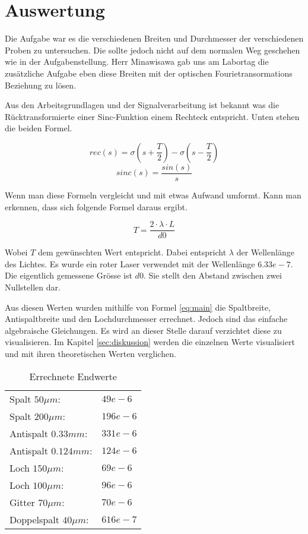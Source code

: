 \section{Auswertung}
Die Aufgabe war es die verschiedenen Breiten und Durchmesser der verschiedenen Proben zu untersuchen. Die sollte jedoch nicht auf dem normalen Weg geschehen wie in der Aufgabenstellung. Herr Minawisawa gab uns am Labortag die zusätzliche Aufgabe eben diese Breiten mit der optischen Fourietransormations Beziehung zu lösen.

Aus den Arbeitsgrundlagen und der Signalverarbeitung ist bekannt was die Rücktransformierte einer Sinc-Funktion einem Rechteck entspricht. Unten stehen die beiden Formel.

\begin{equation}
		rec(s)=\sigma(s+\frac{T}{2}) -\sigma(s-\frac{T}{2})
\end{equation}
\begin{equation}
		sinc(s)=\frac{sin(s)}{s}
\end{equation}

Wenn man diese Formeln vergleicht und mit etwas Aufwand umformt. Kann man erkennen, dass sich folgende Formel daraus ergibt.

\begin{equation}
T = \frac{2\cdot \lambda \cdot L}{d0}
\label{eq:main}
\end{equation}

Wobei $T$ dem gewünschten Wert entspricht. Dabei entspricht $\lambda$ der Wellenlänge des Lichtes. Es wurde ein roter Laser verwendet mit der Wellenlänge $6.33e-7$. Die eigentlich gemessene Grösse ist $d0$. Sie stellt den Abstand zwischen zwei Nullstellen dar.

Aus diesen Werten wurden mithilfe von Formel \ref{eq:main} die Spaltbreite, Antispaltbreite und den Lochdurchmesser errechnet. Jedoch sind das einfache algebraische Gleichungen. Es wird an dieser Stelle darauf verzichtet diese zu visualisieren. Im Kapitel \ref{sec:diskussion} werden die einzelnen Werte visualisiert und mit ihren theoretischen Werten verglichen.

\begin{table}[H]
	\centering
	\begin{tabular}{ll}
		Spalt $50\mu m$:		&  $49e-6$\\
		Spalt $200\mu m$:		&  $196e-6$\\
		Antispalt $0.33mm$: 	&  $331e-6$\\
		Antispalt $0.124mm$:	&  $124e-6$\\
		Loch $150\mu m$: 		&  $69e-6$\\
		Loch $100\mu m$: 		&  $96e-6$\\
		Gitter $70\mu m$:  		&  $70e-6$\\
		Doppelspalt $40\mu m$: 	&  $616e-7$\\
	\end{tabular}
	\caption{Errechnete Endwerte}
	\label{tab:final_values}
\end{table}





